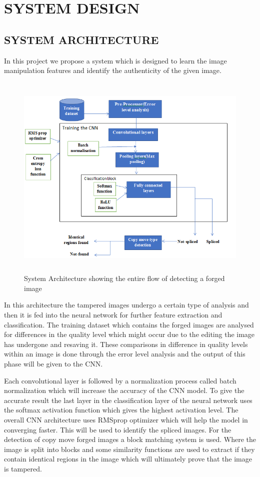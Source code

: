 
\chapter{SYSTEM DESIGN} %
\section{SYSTEM ARCHITECTURE}

\tab In this project we propose a system which is designed to learn the image manipulation features and identify the authenticity of the given image. 
\begin{figure}[htp]
\centering
\includegraphics[scale=0.5,width=15cm,height=10cm]{Figures/finalblock.PNG}
\caption{System Architecture showing the entire flow of detecting a forged image}
\label{fig:universe}
\end{figure}

In this architecture the tampered images undergo a certain type of analysis and then it is fed into the neural network for further feature extraction and classification. The training dataset which contains the forged images are analysed for differences in the quality level which might occur due to the editing the image has undergone and resaving it. These comparisons in difference in quality levels within an image is done through the error level analysis and the output of this phase will be given to the CNN.

\tab Each convolutional layer is followed by a normalization process called batch normalization which will increase the accuracy of the CNN model. To give the accurate result the last layer in the classification layer of the neural network uses the softmax activation function which gives the highest activation level. The overall CNN architecture uses RMSprop optimizer which will help the model in converging faster. This will be used to identify the spliced images.
\tab For the detection of copy move forged images a block matching system is used. Where the image is split into blocks and some similarity functions are used to extract if they contain identical regions in the image which will ultimately prove that the image is tampered.

